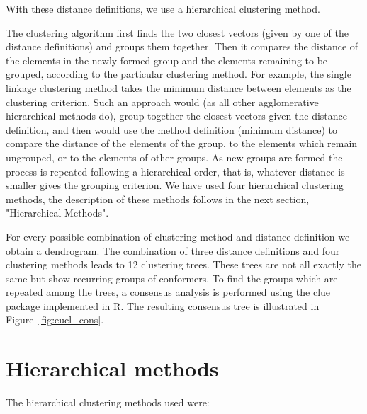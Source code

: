 With  these distance  definitions,  we use  a hierarchical  clustering
method.

The clustering algorithm first finds the two closest vectors (given by
one of  the distance  definitions) and groups  them together.  Then it
compares the  distance of the elements  in the newly  formed group and
the  elements remaining  to be  grouped, according  to  the particular
clustering method.  For example,  the single linkage clustering method
takes  the  minimum  distance   between  elements  as  the  clustering
criterion.   Such  an  approach  would  (as  all  other  agglomerative
hierarchical methods do), group together the closest vectors given the
distance definition, and then would use the method definition (minimum
distance) to compare the distance of the elements of the group, to the
elements  which  remain  ungrouped,   or  to  the  elements  of  other
groups. As new  groups are formed the process  is repeated following a
hierarchical order,  that is, whatever  distance is smaller  gives the
grouping  criterion.   We   have  used  four  hierarchical  clustering
methods, the description of these methods follows in the next section,
"Hierarchical Methods".

For  every  possible combination  of  clustering  method and  distance
definition we  obtain a dendrogram. The combination  of three distance
definitions and four clustering  methods leads to 12 clustering trees.
These trees are not all exactly  the same but show recurring groups of
conformers.  To find the groups  which are repeated among the trees, a
consensus  analysis  is  performed  using  the  \textsf{clue}  package
\cite{hornik2005} implemented  in \textsf{R}. The  resulting consensus
tree is illustrated in Figure~\ref{fig:eucl_cons}.

\section{Hierarchical methods}
The hierarchical clustering methods used were:

